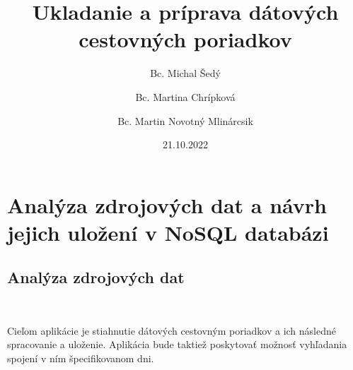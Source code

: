 \documentclass[10pt,xcolor=pdflatex,dvipsnames,table,oneside]{book}
\author{
Bc. Michal Šedý \and 
Bc. Martina Chrípková \and
Bc. Martin Novotný Mlinárcsik
}
\title{Ukladanie a príprava dátových cestovných poriadkov}
\date{21.10.2022}
\begin{document}

\hypersetup{pageanchor=false}%
\maketitle
\hypersetup{pageanchor=true}





\tableofcontents

\newpage%

\part{Analýza zdrojových dat a návrh jejich uložení v NoSQL databázi}

\chapter{Analýza zdrojových dat}\
\par Cieľom aplikácie je stiahnutie dátových cestovným poriadkov a ich následné spracovanie a uloženie. Aplikácia bude taktiež poskytovať možnosť vyhľadania spojení v ním špecifikovanom dni.
\end{document}
